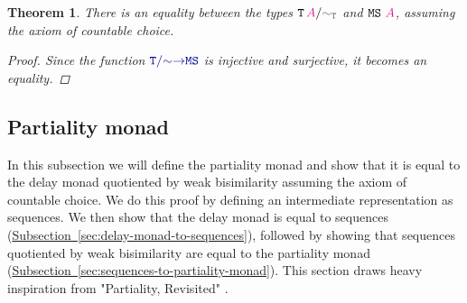 \documentclass[twoside,11pt,openright]{report}
\theoremstyle{plain} %
\newtheorem{thm}{Theorem}[section]
\theoremstyle{definition}
\theoremstyle{remark}
\newcommand*{\subsectionref}[1]{\hyperref[sec:#1]{Subsection~\ref*{sec:#1}}}
\newcommand*{\type}[1]{\textcolor{magenta!90!black}{#1}}
\newcommand*{\relation}[1]{\textcolor{gray!75!black}{\ensuremath{\mathtt{#1}}}}
\newcommand*{\function}[1]{\textcolor{blue!60!black}{\ensuremath{\mathtt{#1}}}}
\newcommand*{\typeformer}[1]{\ensuremath{\mathtt{#1}}}
\begin{document}
\begin{thm}
  \label{thm:QM-QIIT-eq-multiset}
  There is an equality between the types \(\typeformer{T}\,\type{A}/\relation{\sim_{T}}\) and \(\typeformer{MS}~\type{A}\), assuming the axiom of countable choice.
  \begin{proof}
    Since the function \(\function{T/{\sim}{\rightarrow}MS}\) is injective and surjective, it becomes an equality.
  \end{proof}
\end{thm}

\subsection{Partiality monad}
\label{sec:partiality-monad}
In this subsection we will define the partiality monad and show that it is equal to the delay monad quotiented by weak bisimilarity assuming the axiom of countable choice. We do this proof by defining an intermediate representation as sequences. We then show that the delay monad is equal to sequences (\subsectionref{delay-monad-to-sequences}), followed by showing that sequences quotiented by weak bisimilarity are equal to the partiality monad (\subsectionref{sequences-to-partiality-monad}). This section draws heavy inspiration from "Partiality, Revisited" \cite{Partiality-Revisited}.
\end{document}
